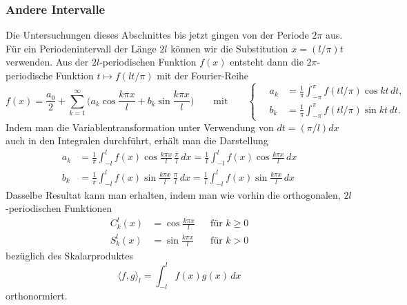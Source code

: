 \subsubsection{Andere Intervalle}
Die Untersuchungen dieses Abschnittes bis jetzt gingen von der 
Periode $2\pi$ aus.
Für ein Periodenintervall der Länge $2l$ können wir die Substitution
$x=(l/\pi)t$ verwenden.
Aus der $2l$-periodischen Funktion $f(x)$ entsteht dann die $2\pi$-periodische
Funktion $t\mapsto f(lt/\pi)$ mit der Fourier-Reihe
\[
f(x)
=
\frac{a_0}{2}
+
\sum_{k=1}^\infty
\biggl(a_k\cos\frac{k\pi x}{l} + b_k\sin\frac{k\pi x}{l}\biggr)
\qquad\text{mit}\qquad
\left\{\quad
\begin{aligned}
a_k
&=
\frac{1}{\pi}
\int_{-\pi}^\pi f(tl/\pi)\cos kt\,dt,
\\
b_k
&=
\frac{1}{\pi}
\int_{-\pi}^\pi f(tl/\pi)\sin kt\,dt.
\end{aligned}
\right.
\]
Indem man die Variablentransformation unter Verwendung von
$dt = (\pi/l)dx$ auch in den Integralen durchführt,
erhält man die Darstellung
\begin{align*}
a_k
&=
\frac{1}{\pi}\int_{-l}^l f(x)\cos\frac{k\pi x}l\,\frac{\pi}{l}\,dx
=
\frac{1}{l}\int_{-l}^l f(x) \cos\frac{k\pi x}{l} \,dx
\\
b_k
&=
\frac{1}{\pi}\int_{-l}^l f(x)\sin\frac{k\pi x}l\,\frac{\pi}{l}\,dx
=
\frac{1}{l}\int_{-l}^l f(x) \sin\frac{k\pi x}{l} \,dx
\end{align*}
Dasselbe Resultat kann man erhalten, indem man wie vorhin die
orthogonalen, $2l$-periodischen Funktionen
\[
\begin{aligned}
C^{l}_k(x) &= \cos\frac{k\pi x}{l} &&\text{für $k\ge 0$}
\\
S^{l}_k(x) &= \sin\frac{k\pi x}{l} &&\text{für $k>0$}
\end{aligned}
\]
bezüglich des Skalarproduktes
\[
\langle f,g\rangle_l
=
\int_{-l}^l f(x)g(x)\,dx
\]
orthonormiert.

%
%
